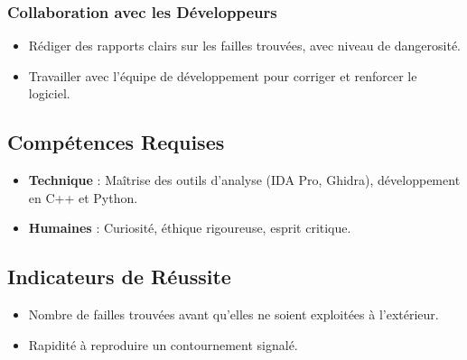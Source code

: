 \documentclass[12pt,a4paper]{article}
\begin{document}
\subsubsection{Collaboration avec les Développeurs}
\begin{itemize}[label=\textbullet]
    \item Rédiger des rapports clairs sur les failles trouvées, avec niveau de dangerosité.
    \item Travailler avec l'équipe de développement pour corriger et renforcer le logiciel.
\end{itemize}

\subsection{Compétences Requises}
\begin{itemize}[label=\textbullet]
    \item \textbf{Technique} : Maîtrise des outils d'analyse (IDA Pro, Ghidra), développement en C++ et Python.
    \item \textbf{Humaines} : Curiosité, éthique rigoureuse, esprit critique.
\end{itemize}

\subsection{Indicateurs de Réussite}
\begin{itemize}[label=\textbullet]
    \item Nombre de failles trouvées avant qu'elles ne soient exploitées à l'extérieur.
    \item Rapidité à reproduire un contournement signalé.
\end{itemize}
\end{document}
